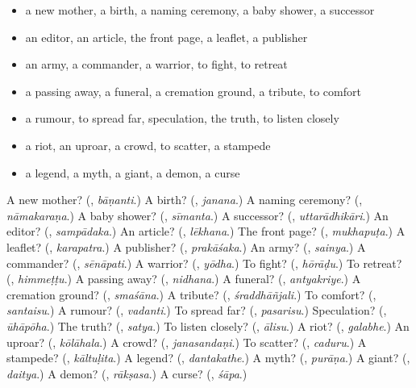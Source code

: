 \begin{itemize}
\raggedright
  \item a new mother, a birth, a naming ceremony, a baby shower, a successor
  \item an editor, an article, the front page, a leaflet, a publisher
  \item an army, a commander, a warrior, to fight, to retreat
  \item a passing away, a funeral, a cremation ground, a tribute, to comfort
  \item a rumour, to spread far, speculation, the truth, to listen closely
  \item a riot, an uproar, a crowd, to scatter, a stampede
  \item a legend, a myth, a giant, a demon, a curse
\end{itemize}

\begin{tcolorbox}[breakable,colback=teal!4,colframe=teal!35!black,title={Before you move on}]
A new mother? (\textbf{}, \emph{bāṇanti}.) A birth? (\textbf{}, \emph{janana}.) A naming ceremony? (\textbf{}, \emph{nāmakaraṇa}.) A baby shower? (\textbf{}, \emph{sīmanta}.) A successor? (\textbf{}, \emph{uttarādhikāri}.) An editor? (\textbf{}, \emph{sampādaka}.) An article? (\textbf{}, \emph{lēkhana}.) The front page? (\textbf{}, \emph{mukhapuṭa}.) A leaflet? (\textbf{}, \emph{karapatra}.) A publisher? (\textbf{}, \emph{prakāśaka}.) An army? (\textbf{}, \emph{sainya}.) A commander? (\textbf{}, \emph{sēnāpati}.) A warrior? (\textbf{}, \emph{yōdha}.) To fight? (\textbf{}, \emph{hōrāḍu}.) To retreat? (\textbf{}, \emph{himmeṭṭu}.) A passing away? (\textbf{}, \emph{nidhana}.) A funeral? (\textbf{}, \emph{antyakriye}.) A cremation ground? (\textbf{}, \emph{smaśāna}.) A tribute? (\textbf{}, \emph{śraddhāñjali}.) To comfort? (\textbf{}, \emph{santaisu}.) A rumour? (\textbf{}, \emph{vadanti}.) To spread far? (\textbf{}, \emph{pasarisu}.) Speculation? (\textbf{}, \emph{ūhāpōha}.) The truth? (\textbf{}, \emph{satya}.) To listen closely? (\textbf{}, \emph{ālisu}.) A riot? (\textbf{}, \emph{galabhe}.) An uproar? (\textbf{}, \emph{kōlāhala}.) A crowd? (\textbf{}, \emph{janasandaṇi}.) To scatter? (\textbf{}, \emph{caduru}.) A stampede? (\textbf{}, \emph{kāltuḷita}.) A legend? (\textbf{}, \emph{dantakathe}.) A myth? (\textbf{}, \emph{purāṇa}.) A giant? (\textbf{}, \emph{daitya}.) A demon? (\textbf{}, \emph{rākṣasa}.) A curse? (\textbf{}, \emph{śāpa}.)
\end{tcolorbox}
